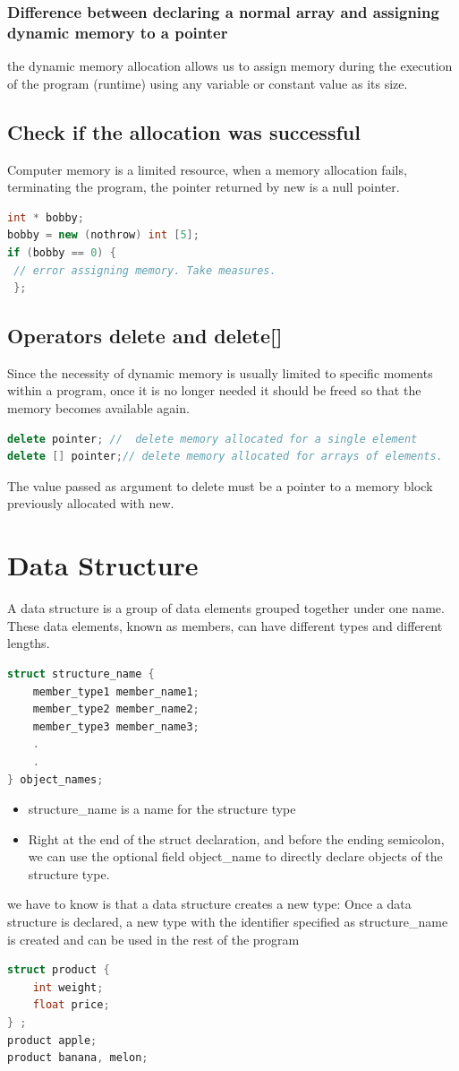 \documentclass[12pt,oneside]{book}
\begin{document}
\subsubsection{Difference between declaring a normal array and assigning dynamic memory to a pointer}
the dynamic memory allocation allows us to assign memory during the execution of the program (runtime) using any variable or constant value as its size.

\subsection{Check if the allocation was successful }
Computer memory is a limited resource, when a memory allocation fails, terminating the program, the pointer returned by new is a null pointer.
	\begin{lstlisting}[language=C++]
int * bobby; 
bobby = new (nothrow) int [5]; 
if (bobby == 0) { 
 // error assigning memory. Take measures.
 }; 
\end{lstlisting}
\subsection{Operators delete and delete[] }
Since the necessity of dynamic memory is usually limited to specific moments within a program, once it is no longer needed it should be freed so that the memory becomes available again.\\
\begin{lstlisting}[language=C++]
delete pointer; //  delete memory allocated for a single element
delete [] pointer;// delete memory allocated for arrays of elements. 
\end{lstlisting}
The value passed as argument to delete must be a pointer to a memory block previously allocated with new.
\section{Data Structure}
A data structure is a group of data elements grouped together under one name. These data elements, known as members, can have different types and different lengths.
	\begin{lstlisting}[language=C++]
struct structure_name { 
    member_type1 member_name1; 
    member_type2 member_name2; 
    member_type3 member_name3; 
    . 
    . 
} object_names; 
\end{lstlisting}
\begin{itemize}
	\item structure\_name is a name for the structure type
	\item Right at the end of the struct declaration, and before the ending semicolon, we can use the optional field object\_name to directly declare objects of the structure type.
\end{itemize}
we have to know is that a data structure creates a new type: Once a data structure is declared, a new type with the identifier specified as structure\_name is created and can be used in the rest of the program
	\begin{lstlisting}[language=C++]
struct product { 
    int weight; 
    float price; 
} ; 
product apple; 
product banana, melon;
\end{lstlisting}
\end{document}
